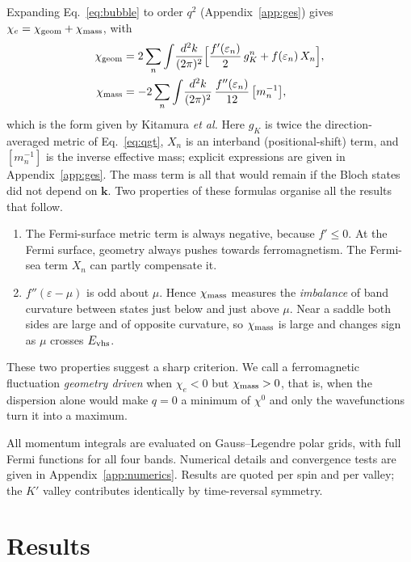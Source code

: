 \documentclass[aps,prb,twocolumn,superscriptaddress,floatfix,nofootinbib]{revtex4-2}
\newcommand{\bk}{\mathbf{k}}
\newcommand{\chie}{\chi_{e}}
\newcommand{\chig}{\chi_{\rm geom}}
\newcommand{\chim}{\chi_{\rm mass}}
\newcommand{\Evhs}{E_{\rm vhs}}
\begin{document}
Expanding Eq.~\eqref{eq:bubble} to order $q^2$ (Appendix~\ref{app:ges}) gives $\chie=\chig+\chim$, with
\begin{align}
\chig&=2\sum_n\int\!\frac{d^2k}{(2\pi)^2}\Big[\frac{f'(\varepsilon_n)}{2}\,g^{n}_{K}+f(\varepsilon_n)\,X_n\Big], \label{eq:chig}\\
\chim&=-2\sum_n\int\!\frac{d^2k}{(2\pi)^2}\,\frac{f''(\varepsilon_n)}{12}\,\big[m_n^{-1}\big], \label{eq:chim}
\end{align}
which is the form given by Kitamura \emph{et al.} Here $g_K$ is twice the direction-averaged metric of Eq.~\eqref{eq:qgt}, $X_n$ is an interband (positional-shift) term, and $[m_n^{-1}]$ is the inverse effective mass; explicit expressions are given in Appendix~\ref{app:ges}. The mass term is all that would remain if the Bloch states did not depend on $\bk$. Two properties of these formulas organise all the results that follow.
\begin{enumerate}
\item The Fermi-surface metric term is always negative, because $f'\le0$. At the Fermi surface, geometry always pushes towards ferromagnetism. The Fermi-sea term $X_n$ can partly compensate it.
\item $f''(\varepsilon-\mu)$ is odd about $\mu$. Hence $\chim$ measures the \emph{imbalance} of band curvature between states just below and just above $\mu$. Near a saddle both sides are large and of opposite curvature, so $\chim$ is large and changes sign as $\mu$ crosses $\Evhs$.
\end{enumerate}
These two properties suggest a sharp criterion. We call a ferromagnetic fluctuation \emph{geometry driven} when $\chie<0$ but $\chim>0$, that is, when the dispersion alone would make $q=0$ a minimum of $\chi^0$ and only the wavefunctions turn it into a maximum.

All momentum integrals are evaluated on Gauss--Legendre polar grids, with full Fermi functions for all four bands. Numerical details and convergence tests are given in Appendix~\ref{app:numerics}. Results are quoted per spin and per valley; the $K'$ valley contributes identically by time-reversal symmetry.

\section{Results}\label{sec:results}
\end{document}
